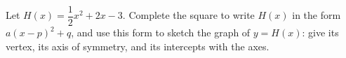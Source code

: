 Let $H(x)=\dfrac12x^2+2x-3$. Complete the square to write $H(x)$ in the form $a(x-p)^2+q$, and use this form to sketch the graph of $y=H(x)$: give its vertex, its axis of symmetry, and its intercepts with the axes.
